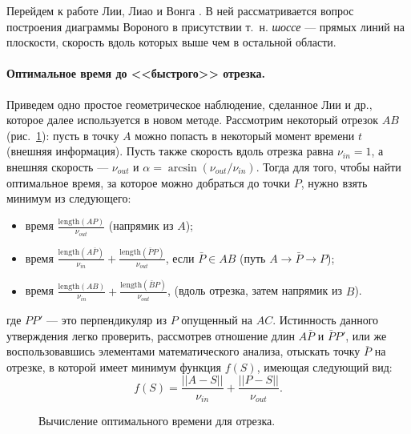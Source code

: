\documentclass[12pt]{article}
\begin{document}
Перейдем к работе Лии, Лиао и Вонга \cite{distmap}. В ней рассматривается
вопрос построения диаграммы Вороного в присутствии т.~н. \emph{шоссе} ---
прямых линий на плоскости, скорость вдоль которых выше чем в остальной области.

\paragraph{Оптимальное время до <<быстрого>> отрезка.}\label{segopt}
Приведем одно простое геометрическое наблюдение, сделанное Лии и др.,
которое далее используется в новом методе. Рассмотрим некоторый отрезок
$AB$ (рис.~\ref{fig_segopt}): пусть в точку $A$ можно попасть в некоторый
момент времени $t$ (внешняя информация). Пусть также скорость вдоль отрезка 
равна $\nu_{in} = 1$, а внешняя скорость --- $\nu_{out}$ и
$\alpha = \arcsin(\nu_{out} / \nu_{in})$. Тогда для того, чтобы найти 
оптимальное время, за которое можно добраться до точки $P$, нужно
взять минимум из следующего:
\begin{itemize}
\item время $\frac{\mathrm{length}(AP)}{\nu_{out}}$ (напрямик из $A$);
\item время $\frac{\mathrm{length}(A\bar{P})}{\nu_{in}} + \frac{\mathrm{length}(\bar{P}P)}{\nu_{out}}$, 
если $\bar{P} \in AB$ (путь $A \to \bar{P} \to P$);
\item время $\frac{\mathrm{length}(AB)}{\nu_{in}} + \frac{\mathrm{length}(\bar{B}P)}{\nu_{out}}$,
(вдоль отрезка, затем напрямик из $B$).
\end{itemize}
где $PP'$ --- это перпендикуляр из $P$ опущенный на $AC$. 
Истинность данного утверждения легко проверить, рассмотрев
отношение длин $A\bar{P}$ и $\bar{P}P'$, или же воспользовавшись
элементами математического анализа, отыскать точку $\bar{P}$ на отрезке,
в которой имеет минимум функция $f(S)$, имеющая следующий вид:
$$
f(S) = \frac{||A - S||}{\nu_{in}} + \frac{||P - S||}{\nu_{out}}.
$$
\begin{figure}
\begin{center}
\end{center}
\caption{Вычисление оптимального времени для отрезка.}
\label{fig_segopt}
\end{figure}
\end{document}

